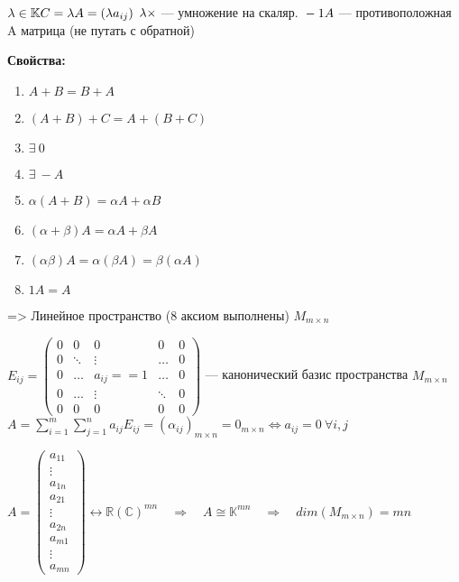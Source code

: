 \( \lambda \in \mathbb{K} \newline
C = \lambda A = (\lambda a_{ij})\)
$\newline \lambda \times$ --- умножение на скаляр.
\(\newline -1 A \) --- противоположная A матрица (не путать с обратной)


\textbf{Свойства:}
\begin{enumerate}
    \item $ A+B = B+A $
    \item $ (A+B)+C = A+(B+C) $
    \item $ \exists \ 0 $
    \item $ \exists \ -A $
    \item $ \alpha(A + B) = \alpha A + \alpha B $
    \item $ (\alpha + \beta)A = \alpha A + \beta A $
    \item $ (\alpha \beta)A = \alpha( \beta A ) = \beta( \alpha A )$
    \item $ 1A = A $

\end{enumerate} => Линейное пространство (8 аксиом выполнены) $ M_{m \times n}$

\( E_{ij} =
\begin{pmatrix}
    0 & 0       & 0           & 0       & 0 \\
    0 & \ddots  & \vdots      & \dots & 0 \\
    0 & \ldots  & a_{ij} == 1 & \ldots  & 0 \\
    0 & \dots & \vdots      & \ddots  & 0 \\
    0 & 0       & 0           & 0       & 0
\end{pmatrix}
\) --- канонический базис пространства $ M_{m \times n}$
\( A = \displaystyle{\sum^m_{i=1}\sum^{n}_{j=1}a_{ij}E_{ij}} = (\alpha_{ij})_{m \times n} = 0_{m \times n} \Leftrightarrow a_{ij} = 0 \ \forall i,j\)

\( A =
\begin{pmatrix}
    a_{11} \\
    \vdots \\
    a_{1n} \\
    a_{21} \\
    \vdots \\
    a_{2n} \\
    a_{m1} \\
    \vdots \\
    a_{mn}
\end{pmatrix} \leftrightarrow \mathbb{R(C)}^{mn}
\quad \Rightarrow \quad A \cong \mathbb{K}^{mn}
\quad \Rightarrow \quad dim(M_{m \times n}) = mn\)

